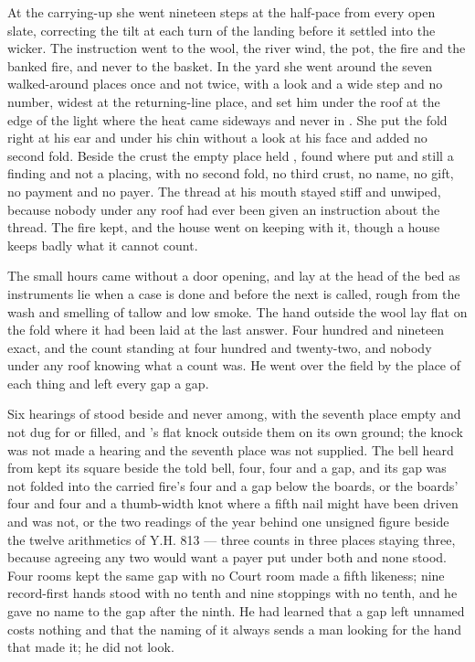 At the carrying-up she went nineteen steps at the half-pace from every open slate, correcting the tilt at each turn of the landing before it settled into the wicker. The instruction went to the wool, the river wind, the pot, the fire and the banked fire, and never to the basket. In the yard she went around the seven walked-around places once and not twice, with a look and a wide step and no number, widest at the returning-line place, and set him under the roof at the edge of the light where the heat came sideways and never in . She put the fold right at his ear and under his chin without a look at his face and added no second fold. Beside the crust the empty place held , found where put and still a finding and not a placing, with no second fold, no third crust, no name, no gift, no payment and no payer. The thread at his mouth stayed stiff and unwiped, because nobody under any roof had ever been given an instruction about the thread. The fire kept, and the house went on keeping with it, though a house keeps badly what it cannot count.

\scenebreak

The small hours came without a door opening, and  lay at the head of the bed as instruments lie when a case is done and before the next is called, rough from the wash and smelling of tallow and low smoke. The hand outside the wool lay flat on the fold where it had been laid at the last answer. Four hundred and nineteen exact, and the count standing at four hundred and twenty-two, and nobody under any roof knowing what a count was. He went over the field by the place of each thing and left every gap a gap.

Six hearings of  stood beside and never among, with the seventh place empty and not dug for or filled, and 's flat knock outside them on its own ground; the knock was not made a hearing and the seventh place was not supplied. The bell heard from  kept its square beside the told bell, four, four and a gap, and its gap was not folded into the carried fire's four and a gap below the boards, or the boards' four and four and a thumb-width knot where a fifth nail might have been driven and was not, or the two readings of the year behind one unsigned figure beside the twelve arithmetics of Y.H. 813 --- three counts in three places staying three, because agreeing any two would want a payer put under both and none stood. Four rooms kept the same gap with no Court room made a fifth likeness; nine record-first hands stood with no tenth and nine stoppings with no tenth, and he gave no name to the gap after the ninth. He had learned that a gap left unnamed costs nothing and that the naming of it always sends a man looking for the hand that made it; he did not look.

